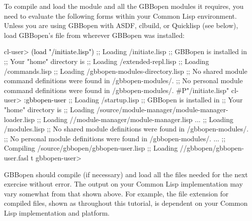 \documentclass[10pt,twoside,english,pdftex]{article}
\begin{document}
%
%
To compile and load the  module and all the GBBopen
modules it requires, you need to evaluate the following forms within your
Common Lisp environment.  Unless you are using GBBopen with ASDF, clbuild, or
Quicklisp (see below), load GBBopen's
 file from wherever GBBopen
was installed:
%
\W\supp
\begin{smallexample}
\textcolor{darkergray}{%
  cl-user> \textcolor{black}{(load "/initiate.lisp")}
  ;; Loading /initiate.lisp
  ;; GBBopen is installed in 
  ;; Your "home" directory is 
  ;;     Loading /extended-repl.lisp
  ;;     Loading /commands.lisp
  ;;     Loading /gbbopen-modules-directory.lisp
  ;; No shared module command definitions were found in /gbbopen-modules/.
  ;; No personal module command definitions were found in /gbbopen-modules/.
  #P"/initiate.lisp"
  cl-user> \textcolor{black}{:gbbopen-user}
  ;; Loading /startup.lisp
  ;; GBBopen is installed in 
  ;; Your "home" directory is 
  ;;  Loading /source/module-manager/module-manager-loader.lisp
  ;; Loading //module-manager/module-manager.lisp
       ...
  ;; Loading /modules.lisp
  ;; No shared module definitions were found in /gbbopen-modules/.
  ;; No personal module definitions were found in /gbbopen-modules/.
       ...
  ;; Compiling /source/gbbopen/gbbopen-user.lisp
  ;; Loading //gbbopen/gbbopen-user.fasl
  t
  gbbopen-user>}
\end{smallexample}

GBBopen should compile (if necessary) and load all the files needed for the
next exercise without error.  The output on your Common Lisp implementation
may vary somewhat from that shown above.  For example, the file extension for
compiled files, shown as  throughout this tutorial, is dependent on
your Common Lisp implementation and platform.
\end{document}

